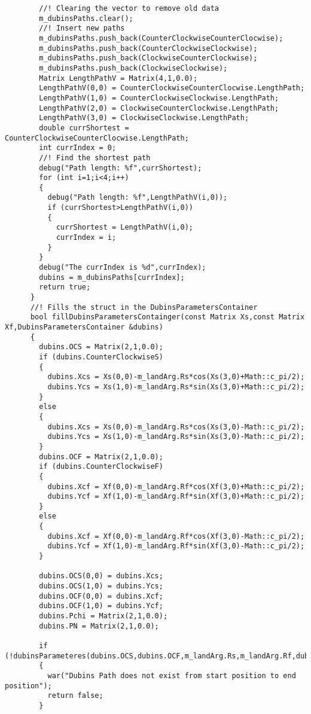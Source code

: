 \begin{frame}[fragile]
\begin{lstlisting}
        //! Clearing the vector to remove old data
        m_dubinsPaths.clear();
        //! Insert new paths
        m_dubinsPaths.push_back(CounterClockwiseCounterClocwise);
        m_dubinsPaths.push_back(CounterClockwiseClockwise);
        m_dubinsPaths.push_back(ClockwiseCounterClockwise);
        m_dubinsPaths.push_back(ClockwiseClockwise);
        Matrix LengthPathV = Matrix(4,1,0.0);
        LengthPathV(0,0) = CounterClockwiseCounterClocwise.LengthPath;
        LengthPathV(1,0) = CounterClockwiseClockwise.LengthPath;
        LengthPathV(2,0) = ClockwiseCounterClockwise.LengthPath;
        LengthPathV(3,0) = ClockwiseClockwise.LengthPath;
        double currShortest = CounterClockwiseCounterClocwise.LengthPath;
        int currIndex = 0;
        //! Find the shortest path
        debug("Path length: %f",currShortest);
        for (int i=1;i<4;i++)
        {
          debug("Path length: %f",LengthPathV(i,0));
          if (currShortest>LengthPathV(i,0))
          {
            currShortest = LengthPathV(i,0);
            currIndex = i;
          }
        }
        debug("The currIndex is %d",currIndex);
        dubins = m_dubinsPaths[currIndex];
        return true;
      }
      //! Fills the struct in the DubinsParametersContainer
      bool fillDubinsParametersContainger(const Matrix Xs,const Matrix Xf,DubinsParametersContainer &dubins)
      {
        dubins.OCS = Matrix(2,1,0.0);
        if (dubins.CounterClockwiseS)
        {
          dubins.Xcs = Xs(0,0)-m_landArg.Rs*cos(Xs(3,0)+Math::c_pi/2);
          dubins.Ycs = Xs(1,0)-m_landArg.Rs*sin(Xs(3,0)+Math::c_pi/2);
        }
        else
        {
          dubins.Xcs = Xs(0,0)-m_landArg.Rs*cos(Xs(3,0)-Math::c_pi/2);
          dubins.Ycs = Xs(1,0)-m_landArg.Rs*sin(Xs(3,0)-Math::c_pi/2);
        }
        dubins.OCF = Matrix(2,1,0.0);
        if (dubins.CounterClockwiseF)
        {
          dubins.Xcf = Xf(0,0)-m_landArg.Rf*cos(Xf(3,0)+Math::c_pi/2);
          dubins.Ycf = Xf(1,0)-m_landArg.Rf*sin(Xf(3,0)+Math::c_pi/2);
        }
        else
        {
          dubins.Xcf = Xf(0,0)-m_landArg.Rf*cos(Xf(3,0)-Math::c_pi/2);
          dubins.Ycf = Xf(1,0)-m_landArg.Rf*sin(Xf(3,0)-Math::c_pi/2);
        }

        dubins.OCS(0,0) = dubins.Xcs;
        dubins.OCS(1,0) = dubins.Ycs;
        dubins.OCF(0,0) = dubins.Xcf;
        dubins.OCF(1,0) = dubins.Ycf;
        dubins.Pchi = Matrix(2,1,0.0);
        dubins.PN = Matrix(2,1,0.0);

        if (!dubinsParameteres(dubins.OCS,dubins.OCF,m_landArg.Rs,m_landArg.Rf,dubins.CounterClockwiseS,dubins.CounterClockwiseF,dubins.Pchi,dubins.PN))
        {
          war("Dubins Path does not exist from start position to end position");
          return false;
        }


\end{lstlisting}
\end{frame}
